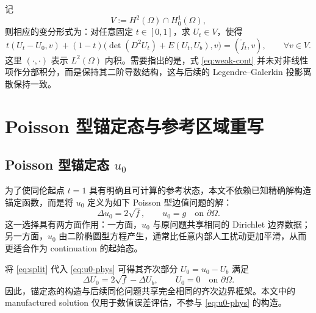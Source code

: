 \documentclass[11pt,a4paper]{article}
\begin{document}
记
\[
V:=H^2(\Omega)\cap H_0^1(\Omega),
\]
则相应的变分形式为：对任意固定 $t\in[0,1]$，求 $U_t\in V$，使得
\begin{equation}
t(U_t-U_0,v)+(1-t)\bigl(\det(D^2U_t)+E(U_t,U_b),v\bigr)=(\widetilde f_t,v),
\qquad \forall v\in V.
\label{eq:weak-cont}
\end{equation}
这里 $(\cdot,\cdot)$ 表示 $L^2(\Omega)$ 内积。需要指出的是，式 \eqref{eq:weak-cont} 并未对非线性项作分部积分，而是保持其二阶导数结构，这与后续的 Legendre--Galerkin 投影离散保持一致。

\section{Poisson 型锚定态与参考区域重写}
\subsection{\texorpdfstring{Poisson 型锚定态 $u_0$}{Poisson 型锚定态 u0}}
为了使同伦起点 $t=1$ 具有明确且可计算的参考状态，本文不依赖已知精确解构造锚定函数，而是将 $u_0$ 定义为如下 Poisson 型边值问题的解：
\begin{equation}
\Delta u_0 = 2\sqrt{f},
\qquad
u_0=g \quad \text{on }\partial\Omega.
\label{eq:u0-phys}
\end{equation}
这一选择具有两方面作用：一方面，$u_0$ 与原问题共享相同的 Dirichlet 边界数据；另一方面，$u_0$ 由二阶椭圆型方程产生，通常比任意内部人工扰动更加平滑，从而更适合作为 continuation 的起始态。

将 \eqref{eq:split} 代入 \eqref{eq:u0-phys} 可得其齐次部分 $U_0=u_0-U_b$ 满足
\begin{equation}
\Delta U_0 = 2\sqrt{f}-\Delta U_b,
\qquad
U_0=0 \quad \text{on }\partial\Omega.
\label{eq:U0-phys}
\end{equation}
因此，锚定态的构造与后续同伦问题共享完全相同的齐次边界框架。本文中的 manufactured solution 仅用于数值误差评估，不参与 \eqref{eq:u0-phys} 的构造。
\end{document}
